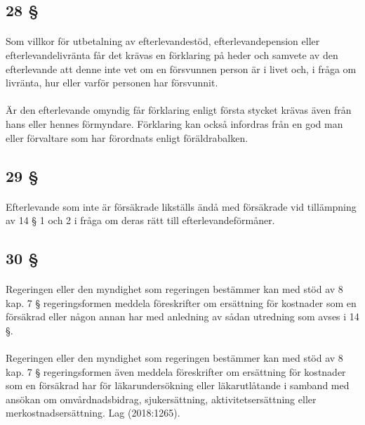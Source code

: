 \documentclass[a4paper,notitlepage,openany,10pt]{book}
\begin{document}
\subsection*{28 §}
\paragraph*{}
Som villkor för utbetalning av efterlevandestöd, efterlevandepension eller efterlevandelivränta får det krävas en förklaring på heder och samvete av den efterlevande att denne inte vet om en försvunnen person är i livet och, i fråga om livränta, hur eller varför personen har försvunnit.
\paragraph*{}
Är den efterlevande omyndig får förklaring enligt första stycket krävas även från hans eller hennes förmyndare.
Förklaring kan också infordras från en god man eller förvaltare som har förordnats enligt föräldrabalken.
\subsection*{29 §}
\paragraph*{}
Efterlevande som inte är försäkrade likställs ändå med försäkrade vid tillämpning av 14 § 1 och 2 i fråga om deras rätt till efterlevandeförmåner.
\subsection*{30 §}
\paragraph*{}
Regeringen eller den myndighet som regeringen bestämmer kan med stöd av 8 kap. 7 § regeringsformen meddela föreskrifter om ersättning för kostnader som en försäkrad eller någon annan har med anledning av sådan utredning som avses i 14 §.
\paragraph*{}
Regeringen eller den myndighet som regeringen bestämmer kan med stöd av 8 kap. 7 § regeringsformen även meddela föreskrifter om ersättning för kostnader som en försäkrad har för läkarundersökning eller läkarutlåtande i samband med ansökan om omvårdnadsbidrag, sjukersättning, aktivitetsersättning eller merkostnadsersättning.
Lag (2018:1265).
\end{document}
